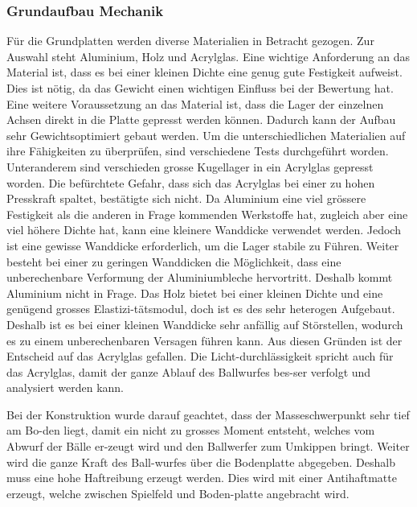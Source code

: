 \subsubsection{Grundaufbau Mechanik}
Für die Grundplatten werden diverse Materialien in Betracht gezogen. Zur Auswahl steht Aluminium, Holz und Acrylglas. Eine wichtige Anforderung an das Material ist, dass es bei einer kleinen Dichte eine genug gute Festigkeit aufweist. Dies ist nötig, da das Gewicht einen wichtigen Einfluss bei der Bewertung hat. Eine weitere Voraussetzung an das Material ist, dass die Lager der einzelnen Achsen direkt in die Platte gepresst werden können. Dadurch kann der Aufbau sehr Gewichtsoptimiert gebaut werden. Um die unterschiedlichen Materialien auf ihre Fähigkeiten zu überprüfen, sind verschiedene Tests durchgeführt worden. Unteranderem sind verschieden grosse Kugellager in ein Acrylglas gepresst worden. Die befürchtete Gefahr, dass sich das Acrylglas bei einer zu hohen Presskraft spaltet, bestätigte sich nicht. Da Aluminium eine viel grössere Festigkeit als die anderen in Frage kommenden Werkstoffe hat, zugleich aber eine viel höhere Dichte hat, kann eine kleinere Wanddicke verwendet werden. Jedoch ist eine gewisse Wanddicke erforderlich, um die Lager stabile zu Führen. Weiter besteht bei einer zu geringen Wanddicken die Möglichkeit, dass eine unberechenbare Verformung der Aluminiumbleche hervortritt. Deshalb kommt Aluminium nicht in Frage. Das Holz bietet bei einer kleinen Dichte und eine genügend grosses Elastizi-tätsmodul, doch ist es des sehr heterogen Aufgebaut. Deshalb ist es bei einer kleinen Wanddicke sehr anfällig auf Störstellen, wodurch es zu einem unberechenbaren Versagen führen kann. Aus diesen Gründen ist der Entscheid auf das Acrylglas gefallen. Die Licht-durchlässigkeit spricht auch für das Acrylglas, damit der ganze Ablauf des Ballwurfes bes-ser verfolgt und analysiert werden kann. 

Bei der Konstruktion wurde darauf geachtet, dass der Masseschwerpunkt sehr tief am Bo-den liegt, damit ein nicht zu grosses Moment entsteht, welches vom Abwurf der Bälle er-zeugt wird und den Ballwerfer zum Umkippen bringt. Weiter wird die ganze Kraft des Ball-wurfes über die Bodenplatte abgegeben. Deshalb muss eine hohe Haftreibung erzeugt werden. Dies wird mit einer Antihaftmatte erzeugt, welche zwischen Spielfeld und Boden-platte angebracht wird.

